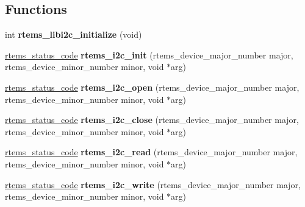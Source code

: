 \subsection*{Functions}
\begin{DoxyCompactItemize}
\item 
\mbox{\label{group__libi2c_ga54050c8f5f11d948e9e9cf006537c998}} 
int {\bfseries rtems\+\_\+libi2c\+\_\+initialize} (void)
\item 
\mbox{\label{group__libi2c_gaf38fea0b37b6946c7d75a105d6d6b54a}} 
\mbox{\hyperlink{group__ClassicStatus_ga545d41846817eaba6143d52ee4d9e9fe}{rtems\+\_\+status\+\_\+code}} {\bfseries rtems\+\_\+i2c\+\_\+init} (rtems\+\_\+device\+\_\+major\+\_\+number major, rtems\+\_\+device\+\_\+minor\+\_\+number minor, void $\ast$arg)
\item 
\mbox{\label{group__libi2c_ga7fcd28f668a5080ca9cece2ca5f72997}} 
\mbox{\hyperlink{group__ClassicStatus_ga545d41846817eaba6143d52ee4d9e9fe}{rtems\+\_\+status\+\_\+code}} {\bfseries rtems\+\_\+i2c\+\_\+open} (rtems\+\_\+device\+\_\+major\+\_\+number major, rtems\+\_\+device\+\_\+minor\+\_\+number minor, void $\ast$arg)
\item 
\mbox{\label{group__libi2c_ga4eb8c3108a76654bc6d81efbb36568e9}} 
\mbox{\hyperlink{group__ClassicStatus_ga545d41846817eaba6143d52ee4d9e9fe}{rtems\+\_\+status\+\_\+code}} {\bfseries rtems\+\_\+i2c\+\_\+close} (rtems\+\_\+device\+\_\+major\+\_\+number major, rtems\+\_\+device\+\_\+minor\+\_\+number minor, void $\ast$arg)
\item 
\mbox{\label{group__libi2c_ga4348fede83f2b6f59958443da89bed5b}} 
\mbox{\hyperlink{group__ClassicStatus_ga545d41846817eaba6143d52ee4d9e9fe}{rtems\+\_\+status\+\_\+code}} {\bfseries rtems\+\_\+i2c\+\_\+read} (rtems\+\_\+device\+\_\+major\+\_\+number major, rtems\+\_\+device\+\_\+minor\+\_\+number minor, void $\ast$arg)
\item 
\mbox{\label{group__libi2c_ga0b7d9e5e077dd27f0e625724562aa23f}} 
\mbox{\hyperlink{group__ClassicStatus_ga545d41846817eaba6143d52ee4d9e9fe}{rtems\+\_\+status\+\_\+code}} {\bfseries rtems\+\_\+i2c\+\_\+write} (rtems\+\_\+device\+\_\+major\+\_\+number major, rtems\+\_\+device\+\_\+minor\+\_\+number minor, void $\ast$arg)

\end{DoxyCompactItemize}
